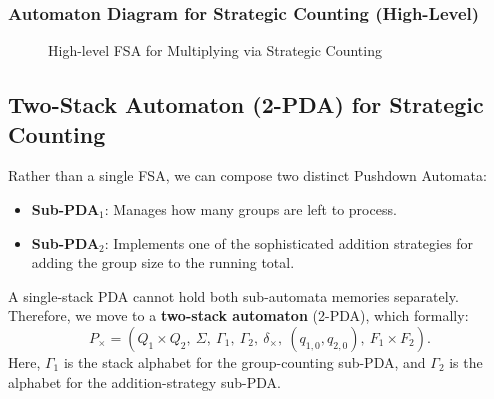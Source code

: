 \documentclass[11pt]{article}
\begin{document}
\subsubsection*{Automaton Diagram for Strategic Counting (High-Level)}
\begin{figure}[H]
\centering
{}
\caption{High-level FSA for Multiplying via Strategic Counting}
\end{figure}

\subsection*{Two-Stack Automaton (2-PDA) for Strategic Counting}

Rather than a single FSA, we can compose two distinct Pushdown Automata:
\begin{itemize}
    \item \textbf{Sub-PDA\(_1\)}: Manages how many groups are left to process. 
    \item \textbf{Sub-PDA\(_2\)}: Implements one of the sophisticated addition strategies for adding the group size to the running total.
\end{itemize}

A single-stack PDA cannot hold both sub-automata memories separately. Therefore, we move to a \textbf{two-stack automaton} (2-PDA), which formally:
\[
P_{\times} = (Q_1 \times Q_2,\ \Sigma,\ \Gamma_1,\ \Gamma_2,\ \delta_{\times},\ (q_{1,0}, q_{2,0}),\ F_1 \times F_2).
\]
Here, \(\Gamma_1\) is the stack alphabet for the group-counting sub-PDA, and \(\Gamma_2\) is the alphabet for the addition-strategy sub-PDA.
\end{document}
